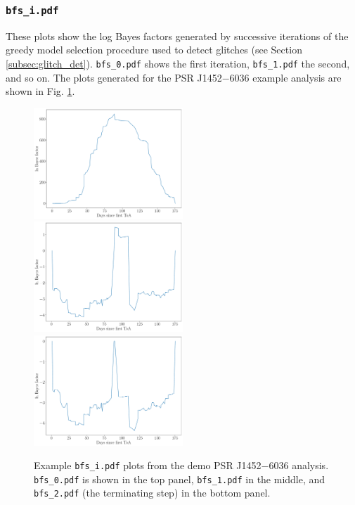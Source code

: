 \documentclass{article}
\begin{document}
\subsubsection{\texttt{bfs\_i.pdf}}
These plots show the log Bayes factors generated by successive iterations of the greedy model selection procedure used to detect glitches (see Section \ref{subsec:glitch_det}).
\texttt{bfs\_0.pdf} shows the first iteration, \texttt{bfs\_1.pdf} the second, and so on.
The plots generated for the PSR J1452$-$6036 example analysis are shown in Fig. \ref{fig:eg_bfs}.
\begin{figure}
    \centering
    \includegraphics[width=0.5\textwidth]{figures/J1452-6036_bfs_0.pdf}
    \includegraphics[width=0.5\textwidth]{figures/J1452-6036_bfs_1.pdf}
    \includegraphics[width=0.5\textwidth]{figures/J1452-6036_bfs_2.pdf}
    \caption{Example \texttt{bfs\_i.pdf} plots from the demo PSR J1452$-$6036 analysis. \texttt{bfs\_0.pdf} is shown in the top panel, \texttt{bfs\_1.pdf} in the middle, and \texttt{bfs\_2.pdf} (the terminating step) in the bottom panel.}
    \label{fig:eg_bfs}
\end{figure}
\end{document}
